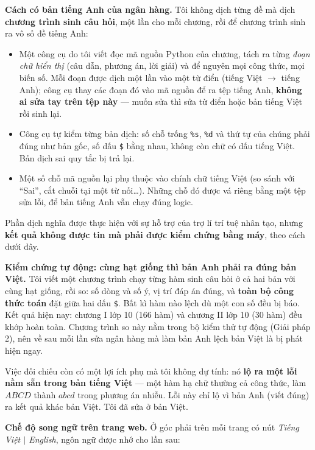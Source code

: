\textbf{Cách có bản tiếng Anh của ngân hàng.} Tôi không dịch từng đề mà dịch
\textbf{chương trình sinh câu hỏi}, một lần cho mỗi chương, rồi để chương trình
sinh ra vô số đề tiếng Anh:

\begin{itemize}[leftmargin=1.2cm, itemsep=2pt]
  \item Một công cụ do tôi viết đọc mã nguồn Python của chương, tách ra từng
        \textit{đoạn chữ hiển thị} (câu dẫn, phương án, lời giải) và để nguyên
        mọi công thức, mọi biến số. Mỗi đoạn được dịch một lần vào một từ điển
        (tiếng Việt $\to$ tiếng Anh); công cụ thay các đoạn đó vào mã nguồn để
        ra tệp tiếng Anh, \textbf{không ai sửa tay trên tệp này} --- muốn sửa thì
        sửa từ điển hoặc bản tiếng Việt rồi sinh lại.
  \item Công cụ tự kiểm từng bản dịch: số chỗ trống \texttt{\%s}, \texttt{\%d}
        và thứ tự của chúng phải đúng như bản gốc, số dấu \texttt{\$} bằng nhau,
        không còn chữ có dấu tiếng Việt. Bản dịch sai quy tắc bị trả lại.
  \item Một số chỗ mã nguồn lại phụ thuộc vào chính chữ tiếng Việt (so sánh với
        ``Sai'', cắt chuỗi tại một từ nối\dots). Những chỗ đó được vá riêng bằng
        một tệp sửa lỗi, để bản tiếng Anh vẫn chạy đúng logic.
\end{itemize}

Phần dịch nghĩa được thực hiện với sự hỗ trợ của trợ lí trí tuệ nhân tạo, nhưng
\textbf{kết quả không được tin mà phải được kiểm chứng bằng máy}, theo cách dưới
đây.

\textbf{Kiểm chứng tự động: cùng hạt giống thì bản Anh phải ra đúng bản Việt.}
Tôi viết một chương trình chạy từng hàm sinh câu hỏi ở cả hai bản với cùng hạt
giống, rồi so: số dòng và số ý, vị trí đáp án đúng, và \textbf{toàn bộ công thức
toán} đặt giữa hai dấu \texttt{\$}. Bất kì hàm nào lệch dù một con số đều bị
báo. Kết quả hiện nay: chương I lớp 10 (166 hàm) và chương II lớp 10 (30 hàm)
đều khớp hoàn toàn. Chương trình so này nằm trong bộ kiểm thử tự động
(Giải pháp 2), nên về sau mỗi lần sửa ngân hàng mà làm bản Anh lệch bản Việt là
bị phát hiện ngay.

Việc đối chiếu còn có một lợi ích phụ mà tôi không dự tính: nó \textbf{lộ ra
một lỗi nằm sẵn trong bản tiếng Việt} --- một hàm hạ chữ thường cả công thức, làm
$ABCD$ thành $abcd$ trong phương án nhiễu. Lỗi này chỉ lộ vì bản Anh (viết đúng)
ra kết quả khác bản Việt. Tôi đã sửa ở bản Việt.

\textbf{Chế độ song ngữ trên trang web.} Ở góc phải trên mỗi trang có nút
\textit{Tiếng Việt $|$ English}, ngôn ngữ được nhớ cho lần sau:

